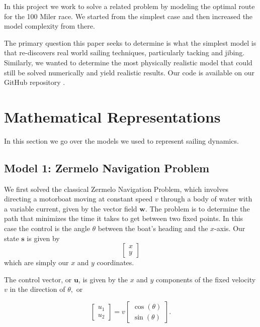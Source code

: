 \documentclass[11pt]{amsart}
\begin{document}
\par In this project we work to solve a related problem by modeling the optimal route for the 100 Miler race. We started from the simplest case and then increased the model complexity from there.

\par The primary question this paper seeks to determine is what the simplest model is that re-discovers real world sailing techniques, particularly tacking and jibing. Similarly, we wanted to determine the most physically realistic model that could still be solved numerically and yield realistic results. Our code is available on our GitHub repository \cite{repo_2026}.

\section{Mathematical Representations}

\par In this section we go over the models we used to represent sailing dynamics.


\subsection{Model 1: Zermelo Navigation Problem}
\label{sec:model1}

\par We first solved the classical Zermelo Navigation Problem, which involves directing a motorboat moving at constant speed $v$ through a body of water with a variable current, given by the vector field $\mathbf{w}.$ The problem is to determine the path that minimizes the time it takes to get between two fixed points. In this case the control is the angle $\theta$ between the boat's heading and the $x$-axis. Our state $\mathbf{s}$ is given by
$$ \begin{bmatrix} x \\ y \end{bmatrix}$$
which are simply our $x$ and $y$ coordinates. 

The control vector, or $\mathbf{u}$, is given by the $x$ and $y$ components of the fixed velocity $v$ in the direction of $\theta,$ or

$$ \begin{bmatrix} u_1 \\ u_2 \end{bmatrix} = v \begin{bmatrix} \cos(\theta) \\ \sin(\theta) \end{bmatrix}.$$
\end{document}
